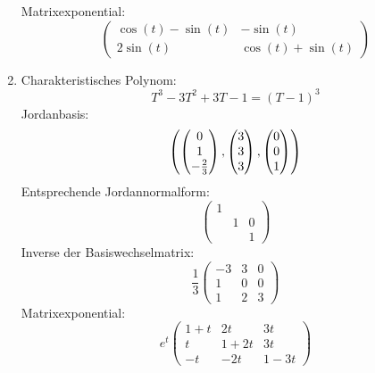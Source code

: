 \documentclass[a4paper, 10pt]{scrartcl}
\begin{document}
\begin{solution}
\begin{enumerate}
      Matrixexponential:
      \[
        \begin{pmatrix}
          \cos(t) - \sin(t) & -\sin(t)            \\
          2 \sin(t)         &  \cos(t) + \sin(t)
        \end{pmatrix}
      \]
    \item
      Charakteristisches Polynom:
      \[
        T^3 - 3 T^2 + 3 T - 1 = (T - 1)^3
      \]
      Jordanbasis:
      \[
        \left( \begin{pmatrix} 0 \\ 1 \\ -\frac{2}{3} \end{pmatrix}, \begin{pmatrix} 3 \\ 3 \\ 3 \end{pmatrix}, \begin{pmatrix} 0 \\ 0 \\ 1 \end{pmatrix} \right)
      \]
      Entsprechende Jordannormalform:
      \[
        \begin{pmatrix}
          1 &   &   \\
            & 1 & 0 \\
            &   & 1
        \end{pmatrix}
      \]
      Inverse der Basiswechselmatrix:
      \[
        \frac{1}{3}
        \begin{pmatrix}
          -3  & 3 & 0 \\
           1  & 0 & 0 \\
           1  & 2 & 3
        \end{pmatrix}
      \]
      Matrixexponential:
      \[
        e^t
        \begin{pmatrix}
          1 + t &     2t  &     3t  \\
              t & 1 + 2t  &     3t  \\
             -t &    -2t  & 1 - 3t
        \end{pmatrix}
      \]
  \end{enumerate}
\end{solution}


\end{document}
